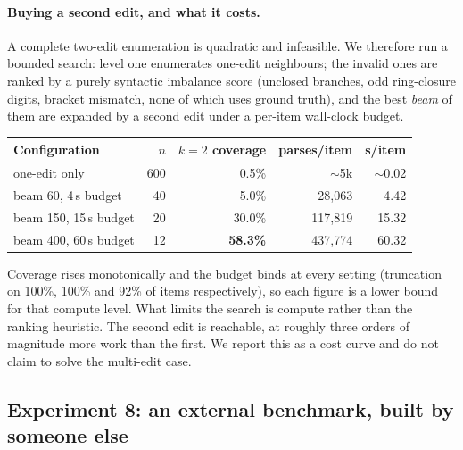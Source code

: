 \documentclass[11pt]{article}
\begin{document}
\paragraph{Buying a second edit, and what it costs.}
A complete two-edit enumeration is quadratic and infeasible. We therefore run a
bounded search: level one enumerates one-edit neighbours; the invalid ones are
ranked by a purely syntactic imbalance score (unclosed branches, odd
ring-closure digits, bracket mismatch, none of which uses ground truth), and the best
\emph{beam} of them are expanded by a second edit under a per-item wall-clock
budget.

\begin{center}\small
\begin{tabular}{lrrrr}
\toprule
Configuration & $n$ & $k{=}2$ coverage & parses/item & s/item \\
\midrule
one-edit only            & 600 & 0.5\%           & $\sim$5k    & $\sim$0.02 \\
beam 60, 4\,s budget     & 40  & 5.0\%           & 28{,}063    & 4.42 \\
beam 150, 15\,s budget   & 20  & 30.0\%          & 117{,}819   & 15.32 \\
beam 400, 60\,s budget   & 12  & \textbf{58.3\%} & 437{,}774   & 60.32 \\
\bottomrule
\end{tabular}
\end{center}

\noindent
Coverage rises monotonically and the budget binds at every setting (truncation
on 100\%, 100\% and 92\% of items respectively), so each figure is a lower bound
for that compute level. What limits the search is compute rather than the ranking
heuristic. The second edit is reachable, at roughly three orders of magnitude
more work than the first. We report this as a cost curve and do not claim to
solve the multi-edit case.

\subsection{Experiment 8: an external benchmark, built by someone else}\label{sec:exp8}
\end{document}
